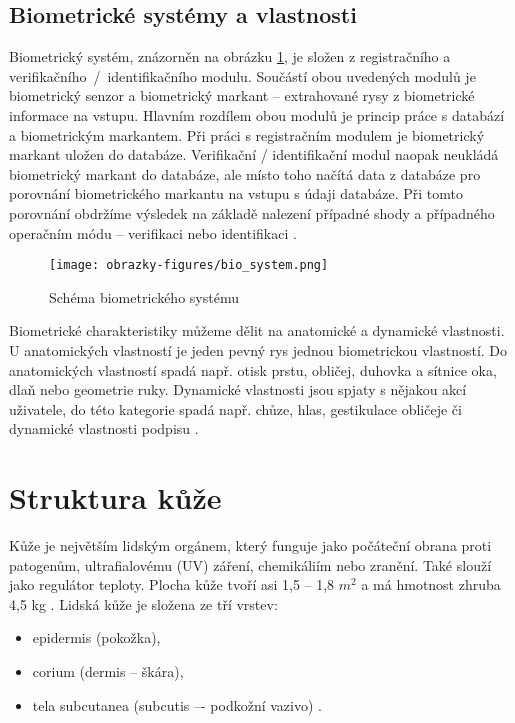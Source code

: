 \subsection{Biometrické systémy a vlastnosti}
Biometrický systém, znázorněn na obrázku \ref{fig:biosystem}, je složen z registračního a verifikačního~/~identifikačního modulu. Součástí obou uvedených modulů je biometrický senzor a biometrický markant -- extrahované rysy z biometrické informace na vstupu. Hlavním rozdílem obou modulů je princip práce s databází a biometrickým markantem.  Při práci s registračním modulem je biometrický markant uložen do databáze. Verifikační / identifikační modul naopak neukládá biometrický markant do databáze, ale místo toho načítá data z databáze pro porovnání biometrického markantu na vstupu s údaji databáze. Při tomto porovnání obdržíme výsledek na základě nalezení případné shody a případného operačním módu -- verifikaci nebo identifikaci \cite{BIOopora}.

\begin{figure}[!htbp]
    \centering
    \texttt{[image: obrazky-figures/bio\_system.png]}
    \caption{Schéma biometrického systému \cite{BIOopora}}
    \label{fig:biosystem}
\end{figure}

Biometrické charakteristiky můžeme dělit na anatomické a dynamické vlastnosti. U anatomických vlastností je jeden pevný rys jednou biometrickou vlastností. Do anatomických vlastností spadá např. otisk prstu, obličej, duhovka a sítnice oka, dlaň nebo geometrie ruky. Dynamické vlastnosti jsou spjaty s nějakou akcí uživatele, do této kategorie spadá např. chůze, hlas, gestikulace obličeje či dynamické vlastnosti podpisu \cite{BIOopora}. 
\section{Struktura kůže}
Kůže je největším lidským orgánem, který funguje jako počáteční obrana proti patogenům, ultrafialovému (UV) záření, chemikáliím nebo zranění. Také slouží jako regulátor teploty. Plocha kůže tvoří asi 1,5 -- 1,8 $m^2$ a má hmotnost zhruba 4,5 kg \cite{ZakladyFunkcniAnatomieCloveka}. 
Lidská kůže je složena ze tří vrstev:
\begin{itemize}
    \item epidermis (pokožka),
    \item corium (dermis -- škára),
    \item tela subcutanea (subcutis –- podkožní vazivo)  \cite{ZakladyFunkcniAnatomieCloveka}.
\end{itemize}

